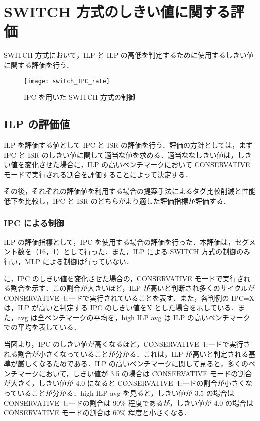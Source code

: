 \section{SWITCH 方式のしきい値に関する評価}
\label{sec:eval_threshold}
SWITCH 方式において，ILP と ILP の高低を判定するために使用するしきい値に関する評価を行う．

\begin{figure}[htb]
  \centering
  \texttt{[image: switch\_IPC\_rate]}
  \caption{IPC を用いた SWITCH 方式の制御}
  \label{fig:switch_IPC_rate}
\end{figure}

\subsection{ILP の評価値}
ILP を評価する値として IPC と ISR の評価を行う．評価の方針としては，まず IPC と ISR のしきい値に関して適当な値を求める．適当ななしきい値は，しきい値を変化させた場合に，ILP の高いベンチマークにおいて CONSERVATIVE モードで実行される割合を評価することによって決定する．

その後，それぞれの評価値を利用する場合の提案手法によるタグ比較削減と性能低下を比較し，IPC と ISR のどちらがより適した評価指標か評価する．

\subsubsection{IPC による制御}
ILP の評価指標として，IPC を使用する場合の評価を行った．本評価は，セグメント数を（16，1）として行った．また，ILP による SWITCH 方式の制御のみ行い，MLP による制御は行っていない．

に，IPC のしきい値を変化させた場合の，CONSERVATIVE モードで実行される割合を示す．この割合が大きいほど，ILP が高いと判断され多くのサイクルが CONSERVATIVE モードで実行されていることを表す．また，各判例の IPC=X は，ILP が高いと判定する IPC のしきい値をX とした場合を示している．また，avg は全ベンチマークの平均を，high ILP avg は ILP の高いベンチマークでの平均を表している． 

当図より，IPC のしきい値が高くなるほど，CONSERVATIVE モードで実行される割合が小さくなっていることが分かる．これは，ILP が高いと判定される基準が厳しくなるためである．ILP の高いベンチマークに関して見ると，多くのベンチマークにおいて，しきい値が 3.5 の場合は CONSERVATIVE モードの割合が大きく，しきい値が 4.0 になると CONSERVATIVE モードの割合が小さくなっていることが分かる．high ILP avg を見ると，しきい値が 3.5 の場合は CONSERVATIVE モードの割合は 90\% 程度であるが，しきい値が 4.0 の場合は CONSERVATIVE モードの割合は 60\% 程度と小さくなる．

